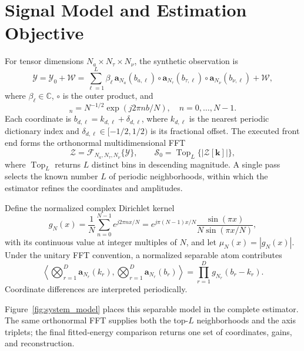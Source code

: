 \section{Signal Model and Estimation Objective}

For tensor dimensions $N_a\times N_\tau\times N_\nu$, the synthetic observation is
\begin{equation}
 \mathcal{Y}=\mathcal{Y}_0+\mathcal{W}
 =\sum_{\ell=1}^{L}\beta_\ell\,
 \mathbf{a}_{N_a}(b_{a,\ell})\circ
 \mathbf{a}_{N_\tau}(b_{\tau,\ell})\circ
 \mathbf{a}_{N_\nu}(b_{\nu,\ell})+\mathcal{W},
 \label{eq:observation_model}
\end{equation}
where $\beta_\ell\in\mathbb{C}$, $\circ$ is the outer product, and
\begin{equation}
 [\mathbf{a}_{N}(b)]_n=N^{-1/2}\exp\!\left(j2\pi nb/N\right),
 \quad n=0,\ldots,N-1.
 \label{eq:steering_atom}
\end{equation}
Each coordinate is $b_{d,\ell}=k_{d,\ell}+\delta_{d,\ell}$, where $k_{d,\ell}$ is the nearest periodic dictionary index and $\delta_{d,\ell}\in[-1/2,1/2)$ is its fractional offset. The executed front end forms the orthonormal multidimensional FFT
\begin{equation}
 \mathcal{Z}=\mathcal{F}_{N_a,N_\tau,N_\nu}\{\mathcal{Y}\},
 \qquad
 \mathcal{S}_0=\operatorname{Top}_{L}\{|\mathcal{Z}[\mathbf{k}]|\},
 \label{eq:fft_top_l}
\end{equation}
where $\operatorname{Top}_{L}$ returns $L$ distinct bins in descending magnitude. A single pass selects the known number $L$ of periodic neighborhoods, within which the estimator refines the coordinates and amplitudes.

Define the normalized complex Dirichlet kernel
\begin{equation}
 g_N(x)=\frac{1}{N}\sum_{n=0}^{N-1}e^{j2\pi nx/N}
 =e^{j\pi(N-1)x/N}\frac{\sin(\pi x)}{N\sin(\pi x/N)},
 \label{eq:complex_dirichlet}
\end{equation}
with its continuous value at integer multiples of $N$, and let
$\mu_N(x)=|g_N(x)|$. Under the unitary FFT convention, a normalized separable
atom contributes
\begin{equation}
 \left\langle\bigotimes_{r=1}^{D}\mathbf a_{N_r}(k_r),
 \bigotimes_{r=1}^{D}\mathbf a_{N_r}(b_r)\right\rangle
 =\prod_{r=1}^{D}g_{N_r}(b_r-k_r).
 \label{eq:tensor_fft_factor}
\end{equation}
Coordinate differences are interpreted periodically.

Figure~\ref{fig:system_model} places this separable model in the complete estimator. The same orthonormal FFT supplies both the top-$L$ neighborhoods and the axis triplets; the final fitted-energy comparison returns one set of coordinates, gains, and reconstruction.

